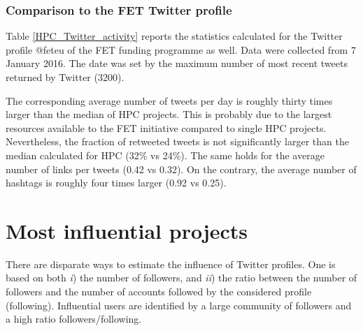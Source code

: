 \subsubsection{Comparison to the FET Twitter profile}
Table \ref{HPC_Twitter_activity} reports the statistics calculated for the Twitter profile @fet\textunderscore eu of the FET funding programme as well. Data were collected from 7 January 2016. The date was set by the maximum number of most recent tweets returned by Twitter (3200). 

The corresponding average number of tweets per day is roughly thirty times larger than the median of HPC projects. This is probably due to the largest resources available to the FET initiative compared to single HPC projects. Nevertheless, the fraction of retweeted tweets is not significantly larger than the median calculated for HPC (32\% vs 24\%). The same holds for the average number of links per tweets (0.42 vs 0.32). On the contrary, the average number of hashtags is roughly four times larger (0.92 vs 0.25).

\section{Most influential projects} \label{Most_influential_projects}
There are disparate ways to estimate the influence of Twitter profiles. One is based on both \textit{i}) the number of followers, and \textit{ii}) the ratio between the number of followers and the number of accounts followed by the considered profile (following). Influential users are identified by a large community of followers and a high ratio followers/following.

